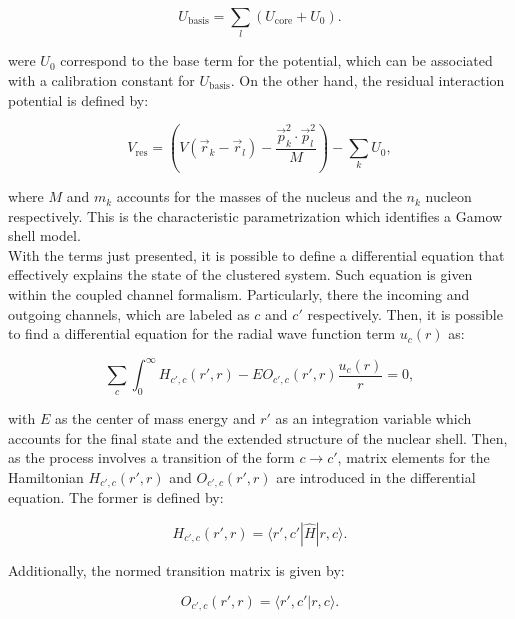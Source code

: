 \documentclass[openany]{book}
\begin{document}
\begin{equation}\label{eq:micro_shellGamow_basis}
	U_{\mathrm{basis}} = \sum_l (  U_{\mathrm{core}} + U_0).
\end{equation}

were $U_0$ correspond to the base term for the potential, which can be associated with a calibration constant for $U_{\mathrm{basis}}$. On the other hand, the residual interaction potential is defined by: 

\begin{equation}\label{eq:micro_shellGamow_residual}
	V_{\mathrm{res}} = \left( {V(\vec r_k - \vec r_l) - \frac{\vec p^2_k \cdot \vec p^2_l}{M}} \right) - \sum_k U_0,
\end{equation}

where $M$ and $m_k$ accounts for the masses of the nucleus and the $n_k$ nucleon respectively. This is the characteristic parametrization which identifies a Gamow shell model. \\

With the terms just presented, it is possible to define a differential equation that effectively explains the state of the clustered system. Such equation is given within the coupled channel formalism. Particularly, there the incoming and outgoing channels, which are labeled as $c$ and $c'$ respectively. Then, it is possible to find a differential equation for the radial wave function term $u_c(r)$ as:

\begin{equation}\label{eq:micro_shellGamow_coupledCahnnel}
	\sum_c \int_0^\infty {H_{c', c} (r', r) - E O_{c', c}(r', r ) \frac{u_c(r)}{r}} = 0,
\end{equation}

with $E$ as the center of mass energy and $r'$ as an integration variable which accounts for the final state and the extended structure of the nuclear shell. Then, as the process involves a transition of the form $c \rightarrow c'$, matrix elements for the Hamiltonian $H_{c', c} (r', r)$ and $O_{c', c}(r', r )$ are introduced in the differential equation. The former is defined by:

\begin{equation}\label{eq:micro_shellGamow_coupledCahnnel_hamiltonian}
	H_{c', c} (r', r) = \langle r', c' | \hat H |  r, c \rangle. 
\end{equation}

Additionally, the normed transition matrix is given by:

\begin{equation}\label{eq:micro_shellGamow_coupledCahnnel_normOperator}
		O_{c', c} (r', r) = \langle r', c' |  r, c \rangle. 
\end{equation}
\end{document}

